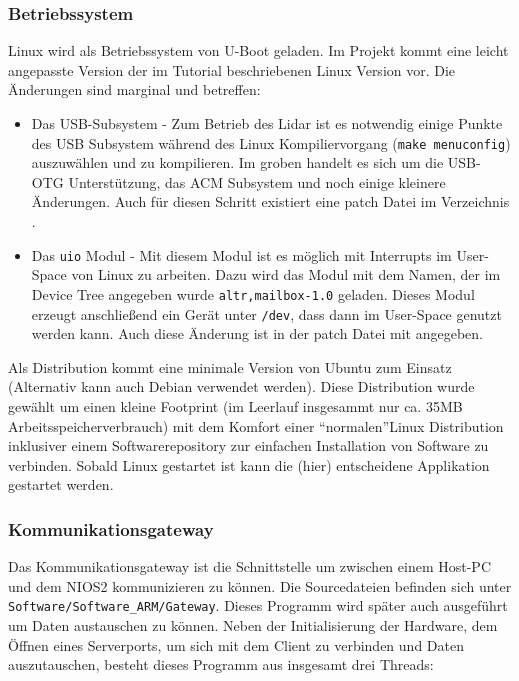 \subsubsection{Betriebssystem}
Linux wird als Betriebssystem von U-Boot geladen. Im Projekt kommt eine leicht angepasste Version der im Tutorial beschriebenen Linux Version vor. Die Änderungen sind marginal und betreffen:
\begin{itemize}
	\item Das USB-Subsystem - Zum Betrieb des \ac{Lidar} ist es notwendig einige Punkte des USB Subsystem während des Linux Kompiliervorgang (\lstinline|make menuconfig|) auszuwählen und zu kompilieren. Im groben handelt es sich um die USB-OTG Unterstützung, das ACM Subsystem und noch einige kleinere Änderungen. Auch für diesen Schritt existiert eine patch Datei im Verzeichnis .
	\item Das \texttt{uio} Modul - Mit diesem Modul ist es möglich mit Interrupts im User-Space von Linux zu arbeiten. Dazu wird das Modul mit dem Namen, der im Device Tree angegeben wurde \lstinline|altr,mailbox-1.0| geladen. Dieses Modul erzeugt anschließend ein Gerät unter \texttt{/dev}, dass dann im User-Space genutzt werden kann. Auch diese Änderung ist in der patch Datei mit angegeben.
\end{itemize}
Als Distribution kommt eine minimale Version von Ubuntu zum Einsatz (Alternativ kann auch Debian verwendet werden). Diese Distribution wurde gewählt um einen kleine Footprint (im Leerlauf insgesammt nur ca. 35MB Arbeitsspeicherverbrauch) mit dem Komfort einer \textquotedblleft normalen\textquotedblright Linux Distribution inklusiver einem Softwarerepository zur einfachen Installation von Software zu verbinden. Sobald Linux gestartet ist kann die (hier) entscheidene Applikation gestartet werden.

\subsubsection{Kommunikationsgateway}
Das Kommunikationsgateway ist die Schnittstelle um zwischen einem Host-PC und dem NIOS2 kommunizieren zu können. Die Sourcedateien befinden sich unter \texttt{Software/Software\_ARM/Gateway}. Dieses Programm wird später auch ausgeführt um Daten austauschen zu können. Neben der Initialisierung der Hardware, dem Öffnen eines Serverports, um sich mit dem Client zu verbinden und Daten auszutauschen, besteht dieses Programm aus insgesamt drei Threads:

